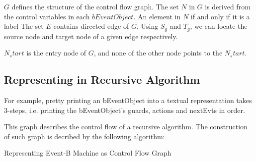 \documentclass{easychair}
\newcommand*\Let[2]{\State #1 $\gets$ #2}
\def\ForEach{\ForAll}
\begin{document}
$G$ defines the structure of the control flow graph. The set $N$ in $G$ is derived from the control variables in each $bEventObject$. An element in $N$ if and only if it is a label 
The set $E$ contains directed edge of $G$. Using $S_g$ and $T_g$, we can locate the source node and target node of a given edge respectively. 

$N_start$ is the entry node of $G$, and none of the other node points to the $N_start$.




\subsection{Representing in Recursive Algorithm}

For example, pretty printing an bEventObject into a textual representation takes 3-steps, i.e. printing the bEventObject's guards, actions and nextEvts in order.

This graph describes the control flow of a recursive algorithm. The construction of such graph is decribed by the following algorithm:
\begin{algorithm}
  \caption{Representing Event-B Machine as Control Flow Graph
    \label{alg:cfg}}
  \begin{algorithmic}[1]
    \Statex
      \ForEach{event $e \in nextEvts $}
        \State
      \EndFor
      \State {}
    \EndFunction
  \end{algorithmic}
\end{algorithm}
\end{document}
